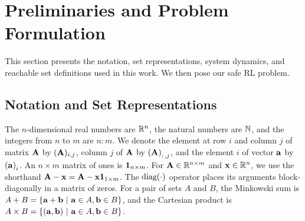 

\section{Preliminaries and Problem Formulation} \label{sec:pb}


This section presents the notation, set representations, system dynamics, and reachable set definitions used in this work. We then pose our safe RL problem.

\subsection{Notation and Set Representations}\label{subsec:notation}
The $n$-dimensional real numbers are ${\mathbb{R}}^n$, the natural numbers are ${\mathbb{N}}$, and the integers from $n$ to $m$ are $n{:}m$.
We denote the element at row $i$ and column $j$ of matrix ${\mathbf{A}}$ by %
$({\mathbf{A}})_{i,j}$, column $j$ of ${\mathbf{A}}$ by ${\left({\mathbf{A}}\right)}_{:\,,j}$, and the element $i$ of vector ${\mathbf{a}}$ by ${\left({\mathbf{a}}\right)}_{i}$.
An $n\times m$ matrix of ones is ${\mathbf{1}}_{n\times m}$.
For ${\mathbf{A}} \in {\mathbb{R}}^{n\times m}$ and ${\mathbf{x}} \in {\mathbb{R}}^n$, we use the shorthand ${\mathbf{A}} - {\mathbf{x}} = {\mathbf{A}} - {\mathbf{x}}{\mathbf{1}}_{1\times m}$.
The $\mathrm{\textnormal{diag}}\!\left(\cdot\right)$ operator places its arguments block-diagonally in a matrix of zeros.
For a pair of sets $A$ and $B$, the Minkowski sum is $A + B = \{\vc{a}+\vc{b}\ |\ \vc{a} \in A, \vc{b} \in B\}$, and the Cartesian product is $A \times B = \{({\mathbf{a}},{\mathbf{b}})\ |\ {\mathbf{a}} \in A, {\mathbf{b}} \in B\}$.



